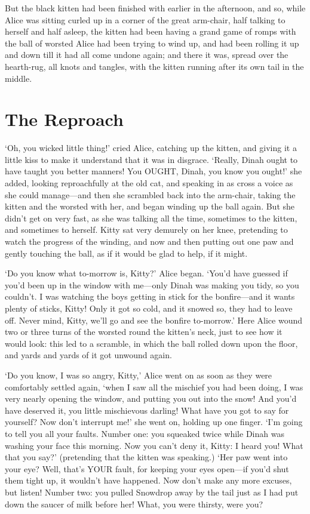\documentclass[phd,tocprelim,draft]{cornell}
\begin{document}
  But the black kitten had been finished with earlier in the
afternoon, and so, while Alice was sitting curled up in a corner
of the great arm-chair, half talking to herself and half asleep,
the kitten had been having a grand game of romps with the ball of
worsted Alice had been trying to wind up, and had been rolling it
up and down till it had all come undone again; and there it was,
spread over the hearth-rug, all knots and tangles, with the
kitten running after its own tail in the middle.

\section{The Reproach}

  `Oh, you wicked little thing!' cried Alice, catching up the
kitten, and giving it a little kiss to make it understand that it
was in disgrace.  `Really, Dinah ought to have taught you better
manners!  You OUGHT, Dinah, you know you ought!' she added,
looking reproachfully at the old cat, and speaking in as cross a
voice as she could manage---and then she scrambled back into the
arm-chair, taking the kitten and the worsted with her, and began
winding up the ball again.  But she didn't get on very fast, as
she was talking all the time, sometimes to the kitten, and
sometimes to herself.  Kitty sat very demurely on her knee,
pretending to watch the progress of the winding, and now and then
putting out one paw and gently touching the ball, as if it would
be glad to help, if it might.

  `Do you know what to-morrow is, Kitty?' Alice began.  `You'd
have guessed if you'd been up in the window with me---only Dinah
was making you tidy, so you couldn't.  I was watching the boys
getting in stick for the bonfire---and it wants plenty of
sticks, Kitty!  Only it got so cold, and it snowed so, they had
to leave off.  Never mind, Kitty, we'll go and see the bonfire
to-morrow.'  Here Alice wound two or three turns of the worsted
round the kitten's neck, just to see how it would look:  this led
to a scramble, in which the ball rolled down upon the floor, and
yards and yards of it got unwound again.

  `Do you know, I was so angry, Kitty,' Alice went on as soon as
they were comfortably settled again, `when I saw all the mischief
you had been doing, I was very nearly opening the window, and
putting you out into the snow!  And you'd have deserved it, you
little mischievous darling!  What have you got to say for
yourself?  Now don't interrupt me!' she went on, holding up one
finger.  `I'm going to tell you all your faults.  Number one:
you squeaked twice while Dinah was washing your face this
morning.  Now you can't deny it, Kitty:  I heard you!  What that
you say?' (pretending that the kitten was speaking.)  `Her paw
went into your eye?  Well, that's YOUR fault, for keeping your
eyes open---if you'd shut them tight up, it wouldn't have
happened.  Now don't make any more excuses, but listen!  Number
two:  you pulled Snowdrop away by the tail just as I had put down
the saucer of milk before her!  What, you were thirsty, were you?
\end{document}

